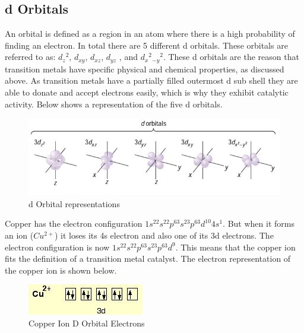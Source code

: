 	\subsection{d Orbitals} 

An orbital is defined as a region in an atom where there is a high probability of finding an electron. In total there are 5 different d orbitals. These orbitals are referred to as: $d_z$$^2$, $d_{xy}$, $d_{xz}$, $d_{yz}$ , and $d_x$$^2$$_{-y}$$^2$. These d orbitals are the reason that transition metals have specific physical and chemical properties, as discussed above. As transition metals have a partially filled outermost d sub shell they are able to donate and accept electrons easily, which is why they exhibit catalytic activity. Below shows a representation of the five d orbitals.


\begin{figure}[H]
    \includegraphics[width=\textwidth]{./Planning/Images/DOrbitals.jpg}
    \caption{d Orbital representations} \label{fig:D Orbitals}
\end{figure}

Copper has the electron configuration $1s^22s^22p^63s^23p^63d^{10}4s^1$. But when it forms an ion ($Cu^{2+}$) it loses its 4s electron and also one of its 3d electrons. The electron configuration is now  $1s^22s^22p^63s^23p^63d^9$.  This means that the copper ion fits the definition of a transition metal catalyst. The electron representation of the copper ion is shown below.

\begin{figure}[H]
    \includegraphics[width=\textwidth]{./Planning/Images/CopperDOrbital.jpg}
    \caption{Copper Ion D Orbital Electrons} \label{fig:Copper D Orbital}
\end{figure}
	

